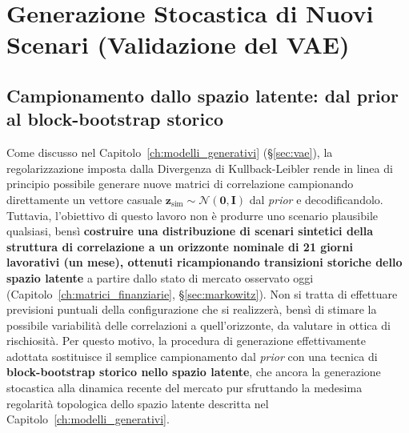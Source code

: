 \chapter{Generazione Stocastica di Nuovi Scenari (Validazione del VAE)}
\label{ch:generazione_stocastica}

\section{Campionamento dallo spazio latente: dal prior al block-bootstrap storico}
\label{sec:block_bootstrap}

Come discusso nel Capitolo~\ref{ch:modelli_generativi} (\S\ref{sec:vae}), la regolarizzazione imposta dalla Divergenza di Kullback-Leibler rende in linea di principio possibile generare nuove matrici di correlazione campionando direttamente un vettore casuale $\mathbf{z}_{\text{sim}} \sim \mathcal{N}(\mathbf{0}, \mathbf{I})$ dal \emph{prior} e decodificandolo. Tuttavia, l'obiettivo di questo lavoro non è produrre uno scenario plausibile qualsiasi, bensì \textbf{costruire una distribuzione di scenari sintetici della struttura di correlazione a un orizzonte nominale di 21 giorni lavorativi (un mese), ottenuti ricampionando transizioni storiche dello spazio latente} a partire dallo stato di mercato osservato oggi (Capitolo~\ref{ch:matrici_finanziarie}, \S\ref{sec:markowitz}). Non si tratta di effettuare previsioni puntuali della configurazione che si realizzerà, bensì di stimare la possibile variabilità delle correlazioni a quell'orizzonte, da valutare in ottica di rischiosità. Per questo motivo, la procedura di generazione effettivamente adottata sostituisce il semplice campionamento dal \emph{prior} con una tecnica di \textbf{block-bootstrap storico nello spazio latente}, che ancora la generazione stocastica alla dinamica recente del mercato pur sfruttando la medesima regolarità topologica dello spazio latente descritta nel Capitolo~\ref{ch:modelli_generativi}.

